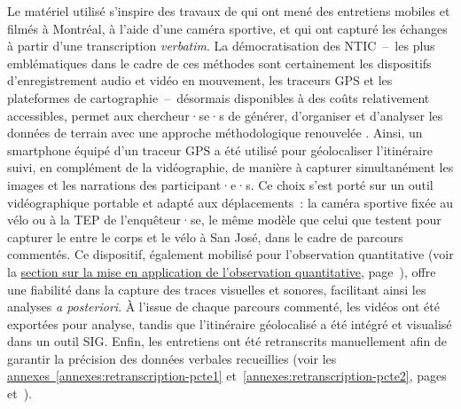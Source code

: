 \begin{refsegment}
Le matériel utilisé s’inspire des travaux de \textcolor{blue}{\textcite[14]{despres_replacer_2019}} qui ont mené des entretiens mobiles et filmés à Montréal, à l’aide d’une caméra sportive, et qui ont capturé les échanges à partir d'une transcription \textsl{verbatim}. La démocratisation des \acrfull{NTIC}~–~les plus emblématiques dans le cadre de ces méthodes  sont certainement les dispositifs d’enregistrement audio et vidéo en mouvement, les traceurs \acrshort{GPS} et les plateformes de cartographie~–~désormais disponibles à des coûts relativement accessibles, permet aux chercheur·se·s de générer, d'organiser et d'analyser les données de terrain avec une approche méthodologique renouvelée \textcolor{blue}{\autocites[1~271]{hein_mobile_2008}[120]{bergeron_uncovering_2014}}. Ainsi, un smartphone équipé d’un traceur \acrshort{GPS} a été utilisé pour géolocaliser l’itinéraire suivi, en complément de la vidéographie, de manière à capturer simultanément les images et les narrations des participant·e·s. Ce choix s’est porté sur un outil vidéographique portable et adapté aux déplacements~: la caméra sportive  fixée au vélo ou à la \acrshort{TEP} de l'enquêteur·se, le même modèle que celui que testent \textcolor{blue}{\textcite[166]{chin_keep_2020}} pour capturer le  entre le corps et le vélo à San José, dans le cadre de parcours commentés. Ce dispositif, également mobilisé pour l’observation quantitative (voir la \hyperref[chap3:application-observation-quantitative]{section sur la mise en application de l’observation quantitative}, page~\pageref{chap3:application-observation-quantitative}), offre une fiabilité dans la capture des traces visuelles et sonores, facilitant ainsi les analyses \textsl{a posteriori}. À l’issue de chaque parcours commenté, les vidéos ont été exportées pour analyse, tandis que l’itinéraire géolocalisé a été intégré et visualisé dans un outil \acrshort{SIG}. Enfin, les entretiens ont été retranscrits manuellement afin de garantir la précision des données verbales recueillies (voir les \hyperref[annexes:retranscription-pcte1]{annexes~\ref{annexes:retranscription-pcte1}} et~\ref{annexes:retranscription-pcte2}, pages~\pageref{annexes:retranscription-pcte1} et~\pageref{annexes:retranscription-pcte2}).%


\end{refsegment}
